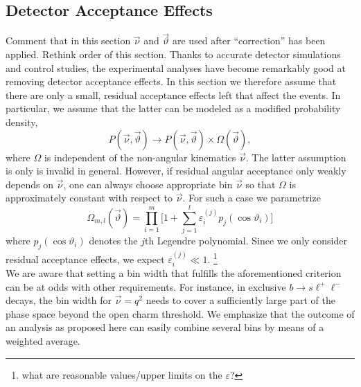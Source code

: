 \documentclass[aps,prd,reprint,nofootinbib,preprintnumbers]{revtex4}
\newcommand{\nuvec}{\vec{\nu}}
\newcommand{\thvec}{\vec{\vartheta}}
\renewcommand{\theta}{\vartheta}
\let\eps\varepsilon
\newcommand{\danny}[1]{{\color{purple}#1}}
\newcommand{\fred}[1]{{\color{brown!85!black}#1}}
\begin{document}
\subsection{Detector Acceptance Effects}
\label{sec:systematics:acceptance}

\fred{Comment that in this section $\vec\nu$ and $\vec\theta$ are used after ``correction'' has been applied.}
\danny{Rethink order of this section.}
Thanks to accurate detector simulations and control studies, the experimental analyses have become
remarkably good at removing detector acceptance effects. In this section we therefore assume that
there are only a small, residual acceptance effects left that affect the events. In particular, we
assume that the latter can be modeled as a modified probability density,
\begin{equation}
    \label{eq:PDFwithDE}
    P(\nuvec,\thvec) \to P(\nuvec,\thvec) \times \Omega(\thvec),
\end{equation}
where $\Omega$ is independent of the non-angular kinematics $\nuvec$. The latter assumption is only
is invalid in general. However, if residual angular acceptance only weakly depends on $\vec{\nu}$, one
can always choose appropriate bin $\vec{\nu}$ so that $\Omega$ is approximately constant with respect
to $\vec{\nu}$. For such a case we parametrize
\begin{equation}
    \Omega_{m,l}(\thvec) = \prod_{i=1}^{m} \Big[1 + \sum_{j=1}^l \eps_i^{(j)} p_j(\cos\theta_i)\big]
\end{equation}
where $p_j(\cos\theta_i)$ denotes the $j$th Legendre polynomial. Since we only consider residual
acceptance effects, we expect $\eps_i^{(j)} \ll 1$. \footnote{\danny{what are reasonable values/upper limits on the $\eps$?}}\\

We are aware that setting a bin width that fulfills the aforementioned criterion can be at odds with
other requirements. For instance, in exclusive $b\to s\ell^+\ell^-$ decays, the bin width for
$\vec{\nu} = q^2$ needs to cover a sufficiently large part of the phase space beyond the open charm
threshold. We emphasize that the outcome of an analysis as proposed here can easily combine several
bins by means of a weighted average.\\
\end{document}
